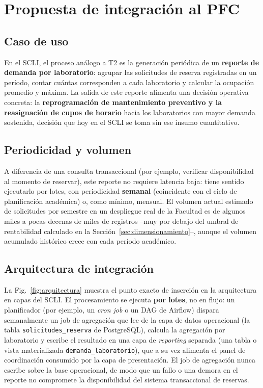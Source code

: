 \documentclass[10pt,journal]{IEEEtran}
\begin{document}
\section{Propuesta de integraci\'on al PFC}
\label{sec:propuesta}

\subsection{Caso de uso}
En el SCLI, el proceso an\'alogo a T2 es la generaci\'on peri\'odica de un
\textbf{reporte de demanda por laboratorio}: agrupar las solicitudes de
reserva registradas en un per\'iodo, contar cu\'antas corresponden a cada
laboratorio y calcular la ocupaci\'on promedio y m\'axima. La salida de este
reporte alimenta una decisi\'on operativa concreta: la
\textbf{reprogramaci\'on de mantenimiento preventivo y la reasignaci\'on de
cupos de horario} hacia los laboratorios con mayor demanda sostenida,
decisi\'on que hoy en el SCLI se toma sin ese insumo cuantitativo.

\subsection{Periodicidad y volumen}
A diferencia de una consulta transaccional (por ejemplo, verificar
disponibilidad al momento de reservar), este reporte no requiere latencia baja:
tiene sentido ejecutarlo por lotes, con periodicidad \textbf{semanal}
(coincidente con el ciclo de planificaci\'on acad\'emica) o, como m\'inimo,
mensual. El volumen actual estimado de solicitudes por semestre en un
despliegue real de la Facultad es de algunos miles a pocas decenas de miles de
registros --muy por debajo del umbral de rentabilidad calculado en la
Secci\'on~\ref{sec:dimensionamiento}--, aunque el volumen acumulado
hist\'orico crece con cada per\'iodo acad\'emico.

\subsection{Arquitectura de integraci\'on}
La Fig.~\ref{fig:arquitectura} muestra el punto exacto de inserci\'on en la
arquitectura en capas del SCLI. El procesamiento se ejecuta \textbf{por
lotes}, no en flujo: un planificador (por ejemplo, un \textit{cron job} o un
DAG de Airflow) dispara semanalmente un job de agregaci\'on que lee de la capa
de datos operacional (la tabla \texttt{solicitudes\_reserva} de PostgreSQL),
calcula la agregaci\'on por laboratorio y escribe el resultado en una capa de
\emph{reporting} separada (una tabla o vista materializada
\texttt{demanda\_laboratorio}), que a su vez alimenta el panel de
coordinaci\'on consumido por la capa de presentaci\'on. El job de agregaci\'on
nunca escribe sobre la base operacional, de modo que un fallo o una demora en
el reporte no compromete la disponibilidad del sistema transaccional de
reservas.
\end{document}
